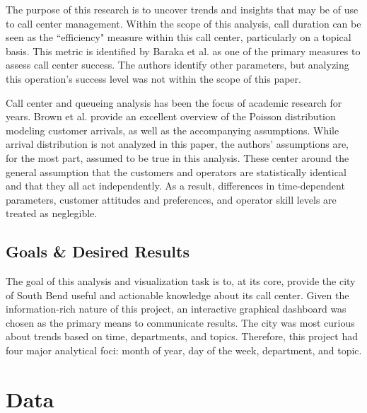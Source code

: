 \documentclass{article}
\begin{document}
The purpose of this research is to uncover trends and insights that may be of use to call center management.  Within the scope of this analysis, call duration can be seen as the ``efficiency" measure within this call center, particularly on a topical basis.  This metric is identified by Baraka et al. as one of the primary measures to assess call center success.\cite{baraka}  The authors identify other parameters, but analyzing this operation's success level was not within the scope of this paper.
\par
Call center and queueing analysis has been the focus of academic research for years.  Brown et al. provide an excellent overview of the Poisson distribution modeling customer arrivals, as well as the accompanying assumptions.  While arrival distribution is not analyzed in this paper, the authors' assumptions are, for the most part, assumed to be true in this analysis.  These center around the general assumption that the customers and operators are statistically identical and that they all act independently.\cite{brown}  As a result, differences in time-dependent parameters, customer attitudes and preferences, and operator skill levels are treated as neglegible.



	\subsection{Goals \& Desired Results}

The goal of this analysis and visualization task is to, at its core, provide the city of South Bend useful and actionable knowledge about its call center.  Given the information-rich nature of this project, an interactive graphical dashboard was chosen as the primary means to communicate results.  The city was most curious about trends based on time, departments, and topics.  Therefore, this project had four major analytical foci:  month of year, day of the week, department, and topic.


\section{Data}
\end{document}
